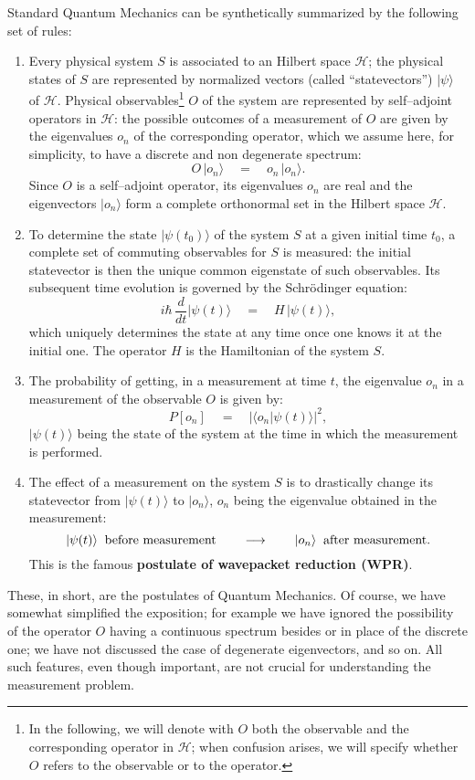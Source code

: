 \documentclass[10pt,a4paper]{article}
\begin{document}
Standard Quantum Mechanics can be synthetically summarized by the
following set of rules:
\begin{enumerate}
\item Every physical system $S$ is associated to an Hilbert space
${\mathcal H}$; the physical states of $S$ are represented by
normalized vectors (called ``statevectors'') $|\psi\rangle$ of
${\mathcal H}$. Physical observables\footnote{In the following, we
will denote with $O$ both the observable and the corresponding
operator in ${\mathcal H}$; when confusion arises, we will specify
whether $O$ refers to the observable or to the operator.} $O$ of
the system are represented by self--adjoint operators in
${\mathcal H}$: the possible outcomes of a measurement of $O$ are
given by the eigenvalues $o_{n}$ of the corresponding operator,
which we assume here, for simplicity, to have a discrete and non
degenerate spectrum:
\begin{equation}
O\,|o_{n}\rangle\quad =\quad o_{n}\,|o_{n}\rangle.
\end{equation}
Since $O$ is a self--adjoint operator, its eigenvalues $o_{n}$ are
real and the eigenvectors $|o_{n}\rangle$ form a complete
orthonormal set in the Hilbert space ${\mathcal H}$.
\item To determine the state $|\psi(t_{0})\rangle$ of
the system $S$ at a given initial time $t_{0}$, a complete set of
commuting observables for $S$ is measured: the initial statevector
is then the unique common eigenstate of such observables. Its
subsequent time evolution is governed by the Schr\"odinger
equation:
\begin{equation} \label{sce}
i\hbar\,\frac{d}{dt}|\psi(t)\rangle \quad = \quad H\,
|\psi(t)\rangle,
\end{equation}
which uniquely determines the state at any time once one knows it
at the initial one. The operator $H$ is the Hamiltonian of the
system $S$.
\item The probability of getting, in a measurement at time $t$,
the eigenvalue $o_{n}$ in a measurement of the observable $O$ is
given by:
\begin{equation}
P[o_{n}] \quad = \quad |\langle o_{n} |\psi(t)\rangle |^{2},
\end{equation}
$|\psi(t)\rangle$ being the state of the system at the time in
which the measurement is performed.
\item The effect of a measurement on the system $S$ is to
drastically change its statevector from $|\psi(t)\rangle$ to
$|o_{n}\rangle$, $o_{n}$ being the eigenvalue obtained in the
measurement:
\[
|\psi(t)\rangle \;\;\makebox{before measurement} \qquad
\longrightarrow \qquad |o_{n}\rangle \;\;\makebox{after
measurement}.
\]
This is the famous {\bf postulate of wavepacket reduction (WPR)}.
\end{enumerate}
These, in short, are the postulates of Quantum Mechanics. Of
course, we have somewhat simplified the exposition; for example we
have ignored the possibility of the operator $O$ having a
continuous spectrum besides or in place of the discrete one; we
have not discussed the case of degenerate eigenvectors, and so on.
All such features, even though important, are not crucial for
understanding the measurement problem.
\end{document}
